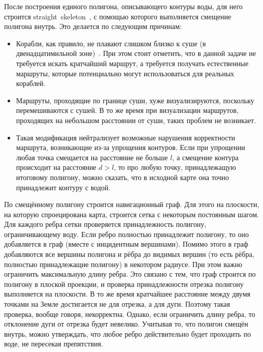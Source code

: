 После построения единого полигона, описывающего контуры воды, для него
строится straight~skeleton~\cite{aichholzer1996straight}, с помощью
которого выполняется смещение полигона внутрь. Это делается по
следующим причинам:
\begin{itemize}
    \item Корабли, как правило, не плавают слишком близко к суше (в
      двенадцатимильной зоне)~\cite{o1984international}. При этом стоит
      отметить, что в данной задаче не требуется искать кратчайший
      маршрут, а требуется получать естественные маршруты, которые
      потенциально могут использоваться для реальных кораблей.
    \item Маршруты, проходящие по границе суши, хуже визуализируются,
      поскольку перемешиваются с сушей. В то же время при визуализации
      маршрутов, проходящих на небольшом расстоянии от суши, таких
      проблем не возникает.
    \item Такая модификация нейтрализует возможные нарушения
      корректности маршрута, возникающие из-за упрощения контуров.
      Если при упрощении любая точка смещается на расстояние не больше
      $l$, а смещение контура происходит на расстояние $d > l$, то про
      любую точку, принадлежащую итоговому полигону, можно сказать,
      что в исходной карте она точно принадлежит контуру с водой.
\end{itemize}

По смещённому полигону строится навигационный граф. Для этого на
плоскости, на которую спроецирована карта,
строится сетка с некоторым постоянным шагом. Для каждого ребра сетки
проверяется принадлежность полигону, ограничивающему воду. Если ребро
полностью принадлежит полигону, то оно добавляется в граф (вместе с
инцидентным вершинами). Помимо этого в граф добавляются все вершины
полигона и рёбра до видимых вершин (то есть рёбра, полностью
принадлежащие полигону) в некотором радиусе. При этом важно ограничить
максимальную длину ребра. Это связано с тем, что граф строится по
полигону в плоской проекции, и проверка принадлежности отрезка
полигону выполняется на плоскости. В то же время кратчайшее расстояние
между двумя точками на Земле достигается не для отрезка, а для дуги.
Поэтому такая проверка, вообще говоря, некорректна. Однако, если
ограничить длину ребра, то отклонение дуги от отрезка будет невелико.
Учитывая то, что полигон смещён внутрь, можно утверждать, что любое
ребро действительно будет проходить по воде, не пересекая препятствия.

